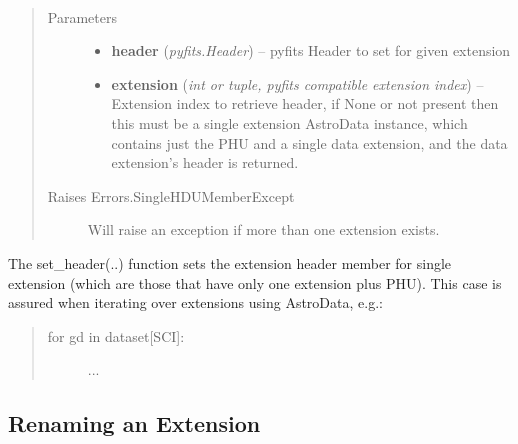 \documentclass[letterpaper,10pt,english]{sphinxmanual}
\begin{document}
\begin{fulllineitems}
\label{chapter_AstroDataClass:astrodata.data.AstroData.set_header}~\begin{quote}\begin{description}
\item[{Parameters}] \leavevmode\begin{itemize}
\item {} 
\textbf{header} (\emph{pyfits.Header}) -- pyfits Header to set for given extension

\item {} 
\textbf{extension} (\emph{int or tuple, pyfits compatible extension index}) -- Extension index to retrieve header, if None
or not present then this must be a single extension AstroData
instance, which contains just the PHU and a single data extension,
and the data extension's header is returned.

\end{itemize}

\item[{Raises Errors.SingleHDUMemberExcept}] \leavevmode
Will raise an exception if more 
than one extension exists.

\end{description}\end{quote}

The set\_header(..) function sets the extension header member for single
extension (which are those that have only one extension plus PHU). This
case  is assured when iterating over extensions using AstroData, e.g.:
\begin{quote}
\begin{description}
\item[{for gd in dataset{[}SCI{]}: }] \leavevmode
...

\end{description}
\end{quote}

\end{fulllineitems}



\subsection{Renaming an Extension}
\label{chapter_AstroDataClass:renaming-an-extension}
\end{document}

